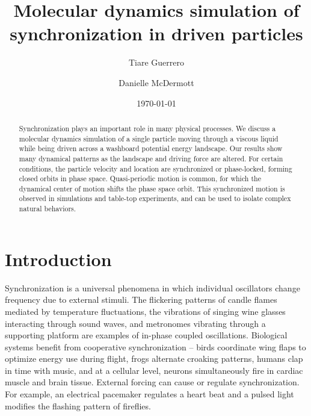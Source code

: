 \documentclass[preprint,showpacs,preprintnumbers,amsmath,amssymb,aps,prb]{revtex4-1}
\theoremstyle{remark}
\begin{document}
\title{Molecular dynamics simulation of synchronization in driven particles}

\author{Tiare Guerrero}

\author{Danielle McDermott}

\date{\today}

\begin{abstract}
  Synchronization
  plays an important role in many physical processes.
  We discuss a 
  molecular dynamics simulation
  of a single particle
  moving through
  a viscous liquid
  while being driven 
  across a washboard potential energy landscape.
  Our results show many dynamical patterns
  as the landscape and driving force are altered.
  For certain conditions,
  the particle velocity and location
  are synchronized or 
  phase-locked,
  forming closed orbits in phase space.
  Quasi-periodic motion is common, 
  for which the
  dynamical center of motion shifts the
  phase space orbit.
  This synchronized motion
  is
  observed in 
  simulations and table-top experiments,
  and
  can be used to isolate
  complex natural behaviors.
\end{abstract}

\maketitle 

\section{Introduction} 
Synchronization is a universal phenomena
in which
individual oscillators change frequency due
to external stimuli.\cite{Pikovsky2003}
The
flickering patterns of
candle flames %
mediated by temperature fluctuations,\cite{Okamoto2016}
the vibrations of singing wine glasses interacting 
through sound waves,\cite{Arane2009}
and metronomes vibrating through a supporting platform\cite{Jia2015}
are examples of in-phase coupled oscillations. 
Biological systems benefit from cooperative
synchronization --
birds coordinate wing flaps
to optimize energy use during flight,\cite{Portugal2014}
frogs alternate croaking patterns,\cite{Aihara2014}
humans clap in time with music,\cite{Tranchant2016}
and 
at a cellular level, 
neurons simultaneously fire in cardiac muscle\cite{MartinHall1999}
and brain tissue.\cite{Singer1999}
External forcing can cause or regulate 
synchronization. For example, 
an electrical pacemaker 
regulates a heart beat 
and 
a pulsed light modifies the
flashing pattern of fireflies. 
\end{document}
